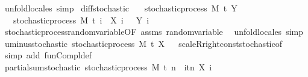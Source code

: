 \begin{isabellebody}
\ {\isacharparenleft}{\kern0pt}unfold{\isacharunderscore}{\kern0pt}locales{\isacharparenright}{\kern0pt}\ simp%
\endisatagproof
{\isafoldproof}%
%
\isadelimproof
\isanewline
%
\endisadelimproof
\isanewline
{}\isamarkupfalse%
\ diff{\isacharunderscore}{\kern0pt}stochastic{\isacharcolon}{\kern0pt}\isanewline
\ \ \ {\isachardoublequoteopen}stochastic{\isacharunderscore}{\kern0pt}process\ M\ t\ Y{\isachardoublequoteclose}\isanewline
\ \ \ {\isachardoublequoteopen}stochastic{\isacharunderscore}{\kern0pt}process\ M\ t\ {\isacharparenleft}{\kern0pt}{\isasymlambda}i\ {\isasymxi}{\isachardot}{\kern0pt}\ X\ i\ {\isasymxi}\ {\isacharminus}{\kern0pt}\ Y\ i\ {\isasymxi}{\isacharparenright}{\kern0pt}{\isachardoublequoteclose}\isanewline
%
\isadelimproof
\ \ %
\endisadelimproof
%
\isatagproof
{}\isamarkupfalse%
\ stochastic{\isacharunderscore}{\kern0pt}process{\isachardot}{\kern0pt}random{\isacharunderscore}{\kern0pt}variable{\isacharbrackleft}{\kern0pt}OF\ assms{\isacharbrackright}{\kern0pt}\ random{\isacharunderscore}{\kern0pt}variable\ \isamarkupfalse%
\ {\isacharparenleft}{\kern0pt}unfold{\isacharunderscore}{\kern0pt}locales{\isacharparenright}{\kern0pt}\ simp%
\endisatagproof
{\isafoldproof}%
%
\isadelimproof
\isanewline
%
\endisadelimproof
\isanewline
{}\isamarkupfalse%
\ uminus{\isacharunderscore}{\kern0pt}stochastic{\isacharcolon}{\kern0pt}\ {\isachardoublequoteopen}stochastic{\isacharunderscore}{\kern0pt}process\ M\ t\ {\isacharparenleft}{\kern0pt}{\isacharminus}{\kern0pt}X{\isacharparenright}{\kern0pt}{\isachardoublequoteclose}%
\isadelimproof
\ %
\endisadelimproof
%
\isatagproof
{}\isamarkupfalse%
\ scaleR{\isacharunderscore}{\kern0pt}right{\isacharunderscore}{\kern0pt}const{\isacharunderscore}{\kern0pt}stochastic{\isacharbrackleft}{\kern0pt}of\ {\isachardoublequoteopen}{\isasymlambda}{\isacharunderscore}{\kern0pt}{\isachardot}{\kern0pt}\ {\isacharminus}{\kern0pt}{}{\isachardoublequoteclose}{\isacharbrackright}{\kern0pt}\ \isamarkupfalse%
\ {\isacharparenleft}{\kern0pt}simp\ add{\isacharcolon}{\kern0pt}\ fun{\isacharunderscore}{\kern0pt}Compl{\isacharunderscore}{\kern0pt}def{\isacharparenright}{\kern0pt}%
\endisatagproof
{\isafoldproof}%
%
\isadelimproof
%
\endisadelimproof
\isanewline
\isanewline
{}\isamarkupfalse%
\ partial{\isacharunderscore}{\kern0pt}sum{\isacharunderscore}{\kern0pt}stochastic{\isacharcolon}{\kern0pt}\ {\isachardoublequoteopen}stochastic{\isacharunderscore}{\kern0pt}process\ M\ t\ {\isacharparenleft}{\kern0pt}{\isasymlambda}n\ {\isasymxi}{\isachardot}{\kern0pt}\ {\isasymSum}i{\isasymin}{\isacharbraceleft}{\kern0pt}tn{\isacharbraceright}{\kern0pt}{\isachardot}{\kern0pt}\ X\ i\ {\isasymxi}{\isacharparenright}{\kern0pt}{\isachardoublequoteclose}%

\end{isabellebody}
